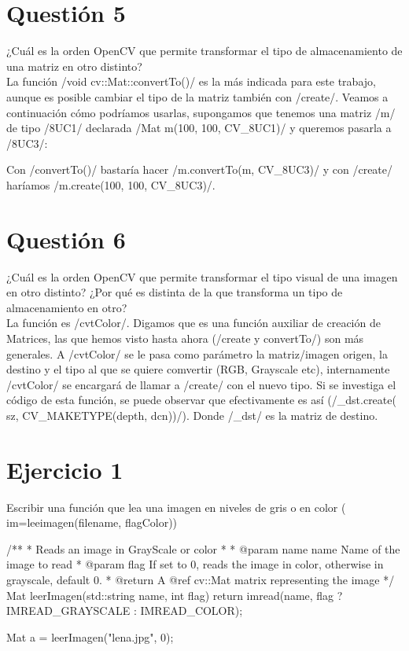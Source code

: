 \documentclass[	DIV=calc,%
							paper=a4,%
							fontsize=11pt]{scrartcl}	 					%
\newcommand{\miit}[1]{{\usefont{T1}{mdugm}{m}{it}\selectfont #1}}
\begin{document}
\section{Questión 5}

\miit{¿Cuál es la orden OpenCV que permite transformar el
tipo de almacenamiento de una matriz en otro distinto?}\\

La función \cppinline/void cv::Mat::convertTo()/ es la más indicada para este trabajo, aunque es posible cambiar el tipo de la matriz también con \cppinline/create/. Veamos a continuación cómo podríamos  usarlas, supongamos que tenemos una matriz \cppinline/m/ de tipo \cppinline/8UC1/ declarada \cppinline/Mat m(100, 100, CV_8UC1)/ y queremos pasarla a \cppinline/8UC3/:

Con \cppinline/convertTo()/ bastaría hacer \cppinline/m.convertTo(m, CV_8UC3)/ y con \cppinline/create/ haríamos \cppinline/m.create(100, 100, CV_8UC3)/.

\section{Questión 6}

\miit{¿Cuál es la orden OpenCV que permite transformar el
tipo visual de una imagen en otro distinto? ¿Por qué es
distinta de la que transforma un tipo de almacenamiento
en otro?}\\

La función es \cppinline/cvtColor/. Digamos que es una función auxiliar de creación de Matrices, las que hemos visto hasta ahora (\cppinline/create y convertTo/) son más generales. A \cppinline/cvtColor/ se le pasa como parámetro la matriz/imagen origen, la destino y el tipo al que se quiere comvertir (RGB, Grayscale etc), internamente \cppinline/cvtColor/ se encargará de llamar a \cppinline/create/ con el nuevo tipo. Si se investiga el código de esta función, se puede observar que efectivamente es así (\cppinline/_dst.create( sz, CV_MAKETYPE(depth, dcn))/). Donde \cppinline/_dst/ es la matriz de destino.


\section{Ejercicio 1}

\miit{Escribir una función que lea una imagen en niveles de gris o en
color ( im=leeimagen(filename, flagColor))}\\

\begin{cppcode}
/**
 * Reads an image in GrayScale or color
 *
 * @param name name Name of the image to read
 * @param flag If set to 0, reads the image in color, otherwise in grayscale, default 0.
 * @return A @ref cv::Mat matrix representing the image
 */
Mat leerImagen(std::string name, int flag) {
   return imread(name, flag ? IMREAD_GRAYSCALE : IMREAD_COLOR);
}

Mat a = leerImagen("lena.jpg", 0);
\end{cppcode}
\end{document}
